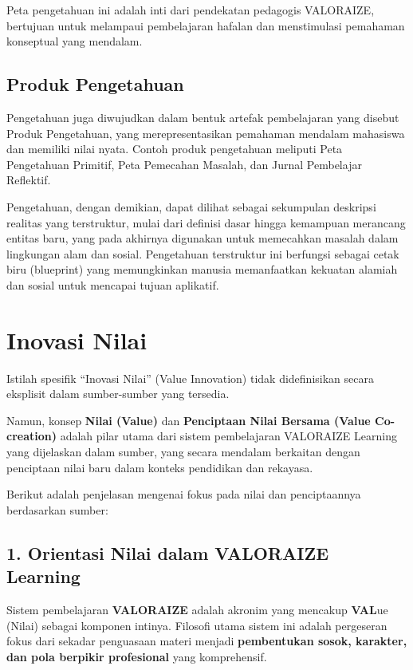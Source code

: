 \documentclass[
  letterpaper,
  DIV=11,
  numbers=noendperiod]{scrreprt}
\begin{document}
Peta pengetahuan ini adalah inti dari pendekatan pedagogis VALORAIZE,
bertujuan untuk melampaui pembelajaran hafalan dan menstimulasi
pemahaman konseptual yang mendalam.

\subsection{Produk Pengetahuan}\label{produk-pengetahuan}

Pengetahuan juga diwujudkan dalam bentuk artefak pembelajaran yang
disebut Produk Pengetahuan, yang merepresentasikan pemahaman mendalam
mahasiswa dan memiliki nilai nyata. Contoh produk pengetahuan meliputi
Peta Pengetahuan Primitif, Peta Pemecahan Masalah, dan Jurnal Pembelajar
Reflektif.

Pengetahuan, dengan demikian, dapat dilihat sebagai sekumpulan deskripsi
realitas yang terstruktur, mulai dari definisi dasar hingga kemampuan
merancang entitas baru, yang pada akhirnya digunakan untuk memecahkan
masalah dalam lingkungan alam dan sosial. Pengetahuan terstruktur ini
berfungsi sebagai cetak biru (blueprint) yang memungkinkan manusia
memanfaatkan kekuatan alamiah dan sosial untuk mencapai tujuan
aplikatif.

\section{Inovasi Nilai}\label{inovasi-nilai}

Istilah spesifik ``Inovasi Nilai'' (Value Innovation) tidak
didefinisikan secara eksplisit dalam sumber-sumber yang tersedia.

Namun, konsep \textbf{Nilai (Value)} dan \textbf{Penciptaan Nilai
Bersama (Value Co-creation)} adalah pilar utama dari sistem pembelajaran
VALORAIZE Learning yang dijelaskan dalam sumber, yang secara mendalam
berkaitan dengan penciptaan nilai baru dalam konteks pendidikan dan
rekayasa.

Berikut adalah penjelasan mengenai fokus pada nilai dan penciptaannya
berdasarkan sumber:

\subsection{1. Orientasi Nilai dalam VALORAIZE
Learning}\label{orientasi-nilai-dalam-valoraize-learning}

Sistem pembelajaran \textbf{VALORAIZE} adalah akronim yang mencakup
\textbf{VAL}ue (Nilai) sebagai komponen intinya. Filosofi utama sistem
ini adalah pergeseran fokus dari sekadar penguasaan materi menjadi
\textbf{pembentukan sosok, karakter, dan pola berpikir profesional} yang
komprehensif.
\end{document}
